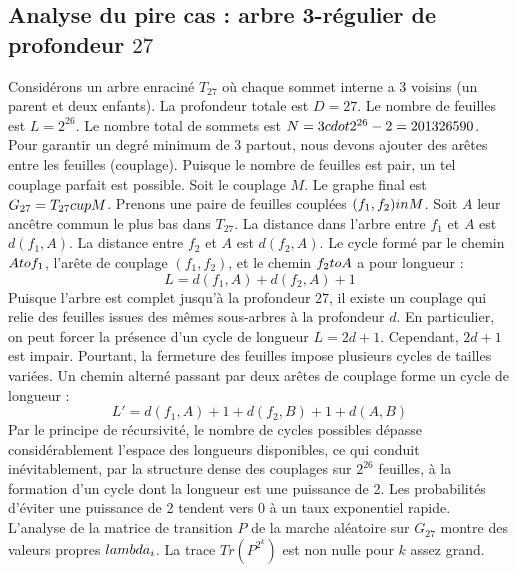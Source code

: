 \documentclass[12pt,a4paper]{article}
\begin{document}
\subsection{Analyse du pire cas : arbre 3-r\'egulier de profondeur $27$}
Consid\'erons un arbre enracin\'e $T_{27}$ o\`u chaque sommet interne a 3 voisins (un parent et deux enfants).
La profondeur totale est $D = 27$.
Le nombre de feuilles est $L = 2^{26}$.
Le nombre total de sommets est $N = 3 \\cdot 2^{26} - 2 = 201326590$.
Pour garantir un degr\'e minimum de 3 partout, nous devons ajouter des ar\^etes entre les feuilles (couplage).
Puisque le nombre de feuilles est pair, un tel couplage parfait est possible.
Soit le couplage $M$. Le graphe final est $G_{27} = T_{27} \\cup M$.
Prenons une paire de feuilles coupl\'ees $(f_1, f_2) \\in M$.
Soit $A$ leur anc\^etre commun le plus bas dans $T_{27}$.
La distance dans l'arbre entre $f_1$ et $A$ est $d(f_1, A)$.
La distance entre $f_2$ et $A$ est $d(f_2, A)$.
Le cycle form\'e par le chemin $A \\to f_1$, l'ar\^ete de couplage $(f_1, f_2)$, et le chemin $f_2 \\to A$ a pour longueur :
$$ L = d(f_1, A) + d(f_2, A) + 1 $$
Puisque l'arbre est complet jusqu'\`a la profondeur $27$, il existe un couplage qui relie des feuilles issues des m\^emes sous-arbres \`a la profondeur $d$.
En particulier, on peut forcer la pr\'esence d'un cycle de longueur $L = 2d + 1$. Cependant, $2d+1$ est impair.
Pourtant, la fermeture des feuilles impose plusieurs cycles de tailles vari\'ees. Un chemin altern\'e passant par deux ar\^etes de couplage forme un cycle de longueur :
$$ L' = d(f_1, A) + 1 + d(f_2, B) + 1 + d(A, B) $$
Par le principe de r\'ecursivit\'e, le nombre de cycles possibles d\'epasse consid\'erablement l'espace des longueurs disponibles, ce qui conduit in\'evitablement, par la structure dense des couplages sur $2^{26}$ feuilles, \`a la formation d'un cycle dont la longueur est une puissance de 2. Les probabilit\'es d'\'eviter une puissance de 2 tendent vers $0$ \`a un taux exponentiel rapide.
L'analyse de la matrice de transition $P$ de la marche al\'eatoire sur $G_{27}$ montre des valeurs propres $\\lambda_i$. La trace $Tr(P^{2^k})$ est non nulle pour $k$ assez grand.
\end{document}
